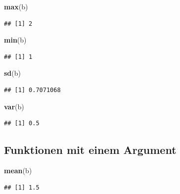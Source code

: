 \documentclass[]{article}
\newenvironment{Shaded}{\begin{snugshade}}{\end{snugshade}}
\newcommand{\KeywordTok}[1]{\textcolor[rgb]{0.13,0.29,0.53}{\textbf{{#1}}}}
\newcommand{\NormalTok}[1]{{#1}}
\begin{document}
\begin{Shaded}
\begin{Highlighting}[]
\KeywordTok{max}\NormalTok{(b)}
\end{Highlighting}
\end{Shaded}

\begin{verbatim}
## [1] 2
\end{verbatim}

\begin{Shaded}
\begin{Highlighting}[]
\KeywordTok{min}\NormalTok{(b)}
\end{Highlighting}
\end{Shaded}

\begin{verbatim}
## [1] 1
\end{verbatim}

\begin{Shaded}
\begin{Highlighting}[]
\KeywordTok{sd}\NormalTok{(b)}
\end{Highlighting}
\end{Shaded}

\begin{verbatim}
## [1] 0.7071068
\end{verbatim}

\begin{Shaded}
\begin{Highlighting}[]
\KeywordTok{var}\NormalTok{(b)}
\end{Highlighting}
\end{Shaded}

\begin{verbatim}
## [1] 0.5
\end{verbatim}

\subsection{Funktionen mit einem
Argument}\label{funktionen-mit-einem-argument}

\begin{Shaded}
\begin{Highlighting}[]
\KeywordTok{mean}\NormalTok{(b)}
\end{Highlighting}
\end{Shaded}

\begin{verbatim}
## [1] 1.5
\end{verbatim}
\end{document}
